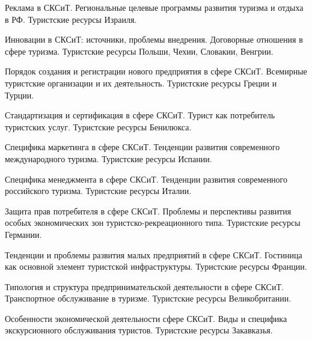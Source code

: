 \documentclass[
	11pt,
	a4paper,
	]
	{article}
\begin{document}
\bigskip

\noindent{} 
	{
		Реклама в СКСиТ.
	}{
		Региональные целевые программы развития туризма и отдыха в РФ.
	}{
		Туристские ресурсы Израиля.
	}

\bigskip

\noindent{} 
	{
		Инновации в СКСиТ: источники, проблемы внедрения.
	}{
		Договорные отношения в сфере туризма.
	}{
		Туристские ресурсы Польши, Чехии, Словакии, Венгрии.
	}

\bigskip

\noindent{} 
	{
		Порядок создания и регистрации нового предприятия в сфере СКСиТ.
	}{
		Всемирные туристские организации и их деятельность.
	}{
		Туристские ресурсы Греции и Турции.
	}

\bigskip

\noindent{} 
	{
		Стандартизация и сертификация в сфере СКСиТ.
	}{
		Турист как потребитель туристских услуг.
	}{
		Туристские ресурсы Бенилюкса.
	}

\bigskip

\noindent{} 
	{
		Специфика маркетинга в сфере СКСиТ.
	}{
		Тенденции развития современного международного туризма.
	}{
		Туристские ресурсы Испании.
	}

\bigskip

\noindent{} 
	{
		Специфика менеджмента в сфере СКСиТ.
	}{
		Тенденции развития современного российского туризма.
	}{
		Туристские ресурсы Италии.
	}

\bigskip

\noindent{} 
	{
		Защита прав потребителя в сфере СКСиТ.
	}{
		Проблемы и перспективы развития особых экономических зон туристско-рекреационного типа.
	}{
		Туристские ресурсы Германии.
	}

\bigskip

\noindent{} 
	{
		Тенденции и проблемы развития малых предприятий в сфере СКСиТ.
	}{
		Гостиница как основной элемент туристской инфраструктуры.
	}{
		Туристские ресурсы Франции.
	}

\bigskip

\noindent{} 
	{
		Типология и структура предпринимательской деятельности в сфере СКСиТ.
	}{
		Транспортное обслуживание в туризме.
	}{
		Туристские ресурсы Великобритании.
	}

\bigskip

\noindent{} 
	{
		Особенности экономической деятельности сфере СКСиТ.
	}{
		Виды и специфика экскурсионного обслуживания туристов.
	}{
		Туристские ресурсы Закавказья.
	}
\end{document}
